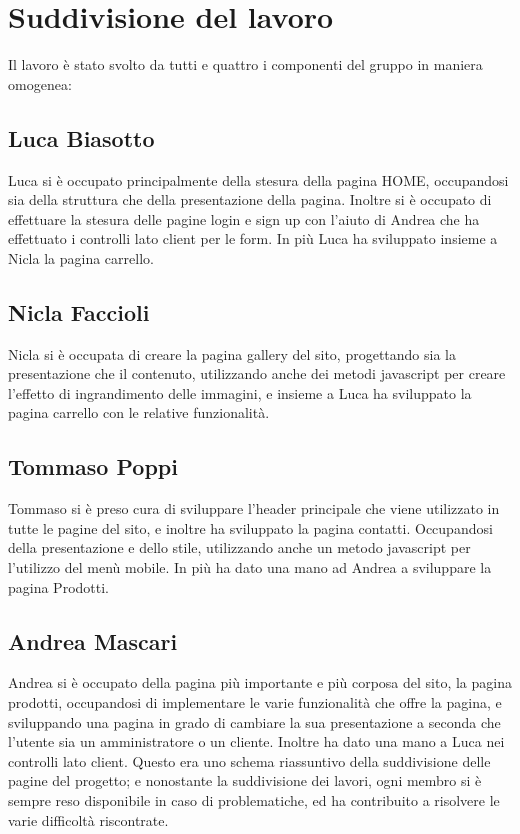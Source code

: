 \section{Suddivisione del lavoro}
Il lavoro è stato svolto da tutti e quattro i componenti del gruppo in maniera omogenea:
	\subsection{Luca Biasotto}
		Luca si è occupato principalmente della stesura della pagina HOME, occupandosi sia della struttura che della presentazione della pagina.
		Inoltre si è occupato di effettuare la stesura delle pagine login e sign up con l’aiuto di Andrea che ha effettuato i controlli lato client per le form.
		In più Luca ha sviluppato insieme a Nicla la pagina carrello.
	\subsection{Nicla Faccioli}
		Nicla si è occupata di creare la pagina gallery del sito, progettando sia la presentazione che il contenuto, utilizzando anche dei metodi javascript per creare l’effetto di ingrandimento delle immagini, e insieme a Luca ha sviluppato la pagina carrello con le relative funzionalità.
	\subsection{Tommaso Poppi}
		Tommaso si è preso cura di sviluppare l’header principale che viene utilizzato in tutte le pagine del sito, e inoltre ha sviluppato la pagina contatti.
		Occupandosi della presentazione e dello stile, utilizzando anche un metodo javascript per l’utilizzo del menù mobile.
		In più ha dato una mano ad Andrea a sviluppare la pagina Prodotti.
	\subsection{Andrea Mascari}
		Andrea si è occupato della pagina più importante e più corposa del sito, la pagina prodotti, occupandosi di implementare le varie funzionalità che offre la pagina, e sviluppando una pagina in grado di cambiare la sua presentazione a seconda che l’utente sia un amministratore o un cliente.
		Inoltre ha dato una mano a Luca nei controlli lato client. Questo era uno schema riassuntivo della suddivisione delle pagine del progetto; e nonostante la suddivisione dei lavori, ogni membro si è sempre reso disponibile in caso di problematiche, ed ha contribuito a risolvere le varie difficoltà riscontrate. 
